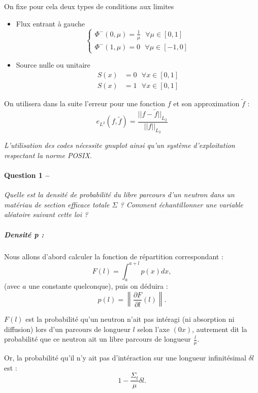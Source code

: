 \documentclass[11pt,a4paper]{article}
\newcommand{\norm}[1]{\big|\big|#1\big|\big|}
\newcommand{\question}[2]{\paragraph{Question #1 --}\hspace{-7pt}\textit{#2} \\}
\begin{document}
On fixe pour cela deux types de conditions aux limites 
\begin{itemize}
\item Flux entrant à gauche
  \begin{equation}
    \begin{cases}
      \Phi^{-} (0, \mu) = \frac{1}{\mu}  ~~~ \forall \mu \in [0,1]\\
      \Phi^{-} (1, \mu) = 0 ~~~ \forall \mu \in [-1,0]
    \end{cases}
  \end{equation}
\item Source nulle ou unitaire
  \begin{align}
    S(x) &= 0 ~~~ \forall x \in [0,1] \\
    S(x) &= 1 ~~~ \forall x \in [0,1] 
  \end{align}
\end{itemize}	

On utilisera dans la suite l'erreur pour une fonction $f$ et son approximation $\tilde{f}$ : 
\begin{equation}
  e_{L^2}(f, \tilde{f}) = \frac{\norm{f-\tilde{f}}_{L_2}}{\norm{f}_{L_2}}
\end{equation}

\emph{L'utilisation des codes nécessite gnuplot ainsi qu'un système d'exploitation respectant la norme POSIX.}

\question{1}{Quelle est la densité de probabilité du libre parcours d'un neutron dans un matériau de section
  efficace totale $\Sigma$ ? Comment échantillonner une variable aléatoire suivant cette loi ?}
\subparagraph{Densité \textit{p} :} Nous allons d'abord calculer la fonction de répartition correspondant :
\begin{equation}
  F(l)=\int_a^{a+l} p(x) dx ,
\end{equation}
(avec $a$ une constante quelconque), puis on déduira :
\begin{equation}
  p(l)=\left\|\frac{\partial F}{\partial l}\left(l\right)\right\| .
\end{equation}

$F(l)$ est la probabilité qu'un neutron n'ait pas intéragi (ni absorption ni diffusion) lors d'un parcours de longueur $l$ selon l'axe $(0x)$, autrement dit la probabilité que ce neutron ait un libre parcours de longueur $\frac{l}{\mu}$.

Or, la probabilité qu'il n'y ait pas d'intéraction sur une longueur infinitésimal $\delta l$ est :
\begin{equation}
  1- \frac{\Sigma_t}{\mu} \delta l .
\end{equation}
\end{document}
